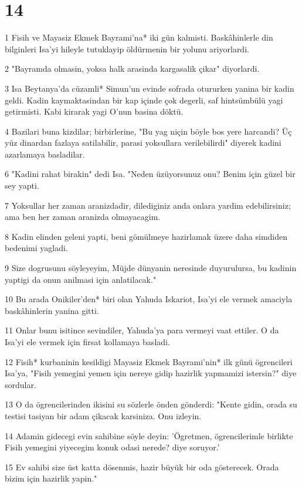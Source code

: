 \chapter{14}

\par 1 Fisih ve Mayasiz Ekmek Bayrami'na* iki gün kalmisti. Baskâhinlerle din bilginleri Isa'yi hileyle tutuklayip öldürmenin bir yolunu ariyorlardi.
\par 2 "Bayramda olmasin, yoksa halk arasinda kargasalik çikar" diyorlardi.
\par 3 Isa Beytanya'da cüzamli* Simun'un evinde sofrada otururken yanina bir kadin geldi. Kadin kaymaktasindan bir kap içinde çok degerli, saf hintsümbülü yagi getirmisti. Kabi kirarak yagi O'nun basina döktü.
\par 4 Bazilari buna kizdilar; birbirlerine, "Bu yag niçin böyle bos yere harcandi? Üç yüz dinardan fazlaya satilabilir, parasi yoksullara verilebilirdi" diyerek kadini azarlamaya basladilar.
\par 6 "Kadini rahat birakin" dedi Isa. "Neden üzüyorsunuz onu? Benim için güzel bir sey yapti.
\par 7 Yoksullar her zaman aranizdadir, dilediginiz anda onlara yardim edebilirsiniz; ama ben her zaman aranizda olmayacagim.
\par 8 Kadin elinden geleni yapti, beni gömülmeye hazirlamak üzere daha simdiden bedenimi yagladi.
\par 9 Size dogrusunu söyleyeyim, Müjde dünyanin neresinde duyurulursa, bu kadinin yaptigi da onun anilmasi için anlatilacak."
\par 10 Bu arada Onikiler'den* biri olan Yahuda Iskariot, Isa'yi ele vermek amaciyla baskâhinlerin yanina gitti.
\par 11 Onlar bunu isitince sevindiler, Yahuda'ya para vermeyi vaat ettiler. O da Isa'yi ele vermek için firsat kollamaya basladi.
\par 12 Fisih* kurbaninin kesildigi Mayasiz Ekmek Bayrami'nin* ilk günü ögrencileri Isa'ya, "Fisih yemegini yemen için nereye gidip hazirlik yapmamizi istersin?" diye sordular.
\par 13 O da ögrencilerinden ikisini su sözlerle önden gönderdi: "Kente gidin, orada su testisi tasiyan bir adam çikacak karsiniza. Onu izleyin.
\par 14 Adamin gidecegi evin sahibine söyle deyin: 'Ögretmen, ögrencilerimle birlikte Fisih yemegini yiyecegim konuk odasi nerede? diye soruyor.'
\par 15 Ev sahibi size üst katta dösenmis, hazir büyük bir oda gösterecek. Orada bizim için hazirlik yapin."
